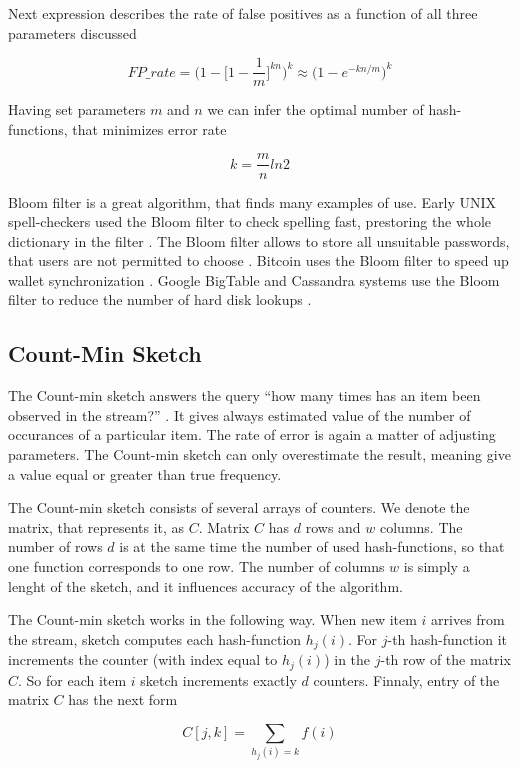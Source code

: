 Next expression describes the rate of false positives as a function of all three parameters discussed

$$
FP\_rate = \Bigg(1 - \Bigg[1 - \frac{1}{m}\Bigg]^{kn}\Bigg)^k \approx \Big(1 - e^{-kn/m}\Big)^k
$$

Having set parameters $m$ and $n$ we can infer the optimal number of hash-functions, that minimizes error rate

$$
k = \frac{m}{n}ln2
$$

Bloom filter is a great algorithm, that finds many examples of use.
Early UNIX spell-checkers used the Bloom filter to check spelling fast, prestoring the whole dictionary in the filter \cite{BroderMitzenmacher2005}.
The Bloom filter allows to store all unsuitable passwords, that users are not permitted to choose \cite{BroderMitzenmacher2005}.
Bitcoin uses the Bloom filter to speed up wallet synchronization \cite{BitcoinFoundation2012}.
Google BigTable and Cassandra systems use the Bloom filter to reduce the number of hard disk lookups \cite{Bigtable/Chang_Dean_Ghemawat}.

\subsection{Count-Min Sketch}

The Count-min sketch answers the query ``how many times has an item been observed in the stream?'' \cite{Cormode}.
It gives always estimated value of the number of occurances of a particular item.
The rate of error is again a matter of adjusting parameters.
The Count-min sketch can only overestimate the result, meaning give a value equal or greater than true frequency.

The Count-min sketch consists of several arrays of counters.
We denote the matrix, that represents it, as $C$.
Matrix $C$ has $d$ rows and $w$ columns.
The number of rows $d$ is at the same time the number of used hash-functions, so that one function corresponds to one row.
The number of columns $w$ is simply a lenght of the sketch, and it influences accuracy of the algorithm.

The Count-min sketch works in the following way.
When new item $i$ arrives from the stream, sketch computes each hash-function $h_j(i)$.
For $j$-th hash-function it increments the counter (with index equal to $h_j(i)$) in the $j$-th row of the matrix $C$.
So for each item $i$ sketch increments exactly $d$ counters.
Finnaly, entry of the matrix $C$ has the next form

$$
C[j, k] = \sum_{h_j(i)=k}f(i)
$$

